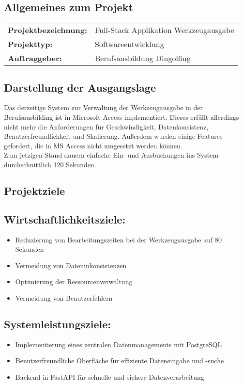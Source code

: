 \documentclass[a4paper, 12pt]{article}
\begin{document}
\subsection{Allgemeines zum Projekt}

\begin{tabular}{@{} l l @{}}
    \textbf{Projektbezeichnung:} & Full-Stack Applikation Werkzeugausgabe \\
    \textbf{Projekttyp:} & Softwareentwicklung \\
    \textbf{Auftraggeber:} & Berufsausbildung Dingolfing \\
\end{tabular}

\vspace{1cm}

\subsection{Darstellung der Ausgangslage}
Das derzeitige System zur Verwaltung der Werkzeugausgabe in der Berufsausbilding ist in Microsoft Access implementiert. Dieses erfüllt allerdings nicht mehr die Anforderungen für Geschwindigkeit, Datenkonsistenz, Benutzerfreundlichkeit und Skalierung. Außerdem wurden einige Features gefordert, die in MS Access nicht umgesetzt werden können. \\
Zum jetzigen Stand dauern einfache Ein- und Ausbuchungen ins System durchschnittlich 120 Sekunden.

\vspace{1cm}

\subsection{Projektziele}
\subsection*{Wirtschaftlichkeitsziele:}
\begin{itemize}[itemsep=0cm] 
    \item Reduzierung von Bearbeitungszeiten bei der Werkzeugausgabe auf 80 Sekunden
    \item Vermeidung von Dateninkonsistenzen
    \item Optimierung der Ressourcenverwaltung
    \item Vermeidung von Benutzerfehlern
\end{itemize}

\subsection*{Systemleistungsziele:}
\begin{itemize}[itemsep=0cm] 
    \item Implementierung eines zentralen Datenmanagements mit PostgreSQL
    \item Benutzerfreundliche Oberfläche für effiziente Dateneingabe und -suche
    \item Backend in FastAPI für schnelle und sichere Datenverarbeitung
\end{itemize}
\end{document}
